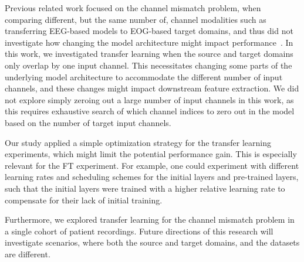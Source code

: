 Previous related work focused on the channel mismatch problem, when comparing different, but the same number of, channel modalities such as transferring \ac{EEG}-based models to \ac{EOG}-based target domains, and thus did not investigate how changing the model architecture might impact performance~\cite{Phan2019, Phan2019c}.
In this work, we investigated transfer learning when the source and target domains only overlap by one input channel.
This necessitates changing some parts of the underlying model architecture to accommodate the different number of input channels, and these changes might impact downstream feature extraction.
We did not explore simply zeroing out a large number of input channels in this work, as this requires exhaustive search of which channel indices to zero out in the model based on the number of target input channels. 

Our study applied a simple optimization strategy for the transfer learning experiments, which might limit the potential performance gain.
This is especially relevant for the FT experiment. 
For example, one could experiment with different learning rates and scheduling schemes for the initial layers and pre-trained layers, such that the initial layers were trained with a higher relative learning rate to compensate for their lack of initial training.

Furthermore, we explored transfer learning for the channel mismatch problem in a single cohort of patient recordings. 
Future directions of this research will investigate scenarios, where both the source and target domains, and the datasets are different.